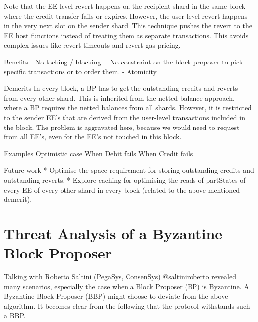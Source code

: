 \documentclass{article}
\begin{document}
Note that the EE-level revert happens on the recipient shard in the same block where the credit transfer fails or expires. However, the user-level revert happens in the very next slot on the sender shard. This technique pushes the revert to the EE host functions instead of treating them as separate transactions. This avoids complex issues like revert timeouts and revert gas pricing.

Benefits
- No locking / blocking.
- No constraint on the block proposer to pick specific transactions or to order them.
- Atomicity

Demerits
In every block, a BP has to get the outstanding credits and reverts from every other shard. This is inherited from the netted balance approach, where a BP requires the netted balances from all shards. However, it is restricted to the sender EE's that are derived from the user-level transactions included in the block. The problem is aggravated here, because we would need to request from all EE's, even for the EE's not touched in this block.

Examples
Optimistic case
When Debit fails
When Credit fails

Future work
* Optimise the space requirement for storing outstanding credits and outstanding reverts.
* Explore caching for optimising the reads of partStates of every EE of every other shard in every block (related to the above mentioned demerit).

\section{Threat Analysis of a Byzantine Block Proposer}
\label{sec:threat}
Talking with Roberto Saltini (PegaSys, ConsenSys) @saltiniroberto revealed many scenarios, especially the case when a Block Proposer (BP) is Byzantine. A Byzantine Block Proposer (BBP) might choose to deviate from the above algorithm. It becomes clear from the following that the protocol withstands such a BBP.
\end{document}
